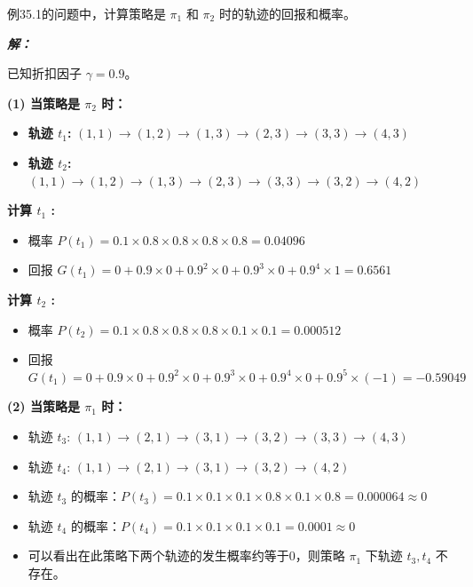 \documentclass[12pt, a4paper]{article}
\newenvironment{solution}{
	\par\vspace{0.2cm}\noindent\textbf{\color{themecolor} \textit{解：}}
}{
	\par\vspace{0.5cm} %
}
\begin{document}
	\clearpage
	\begin{problem}[习题 35.3]
		例35.1的问题中，计算策略是 $\pi_1$ 和 $\pi_2$ 时的轨迹的回报和概率。
	\end{problem}
	
	\begin{solution}
		已知折扣因子 $\gamma = 0.9$。
		
		\textbf{(1) 当策略是 $\pi_2$ 时：}
		\begin{itemize}
			\item[] \textbf{轨迹 $t_1$:} $(1,1) \to (1,2) \to (1,3) \to (2,3) \to (3,3) \to (4,3)$
			\item[] \textbf{轨迹 $t_2$:} $(1,1) \to (1,2) \to (1,3) \to (2,3) \to (3,3) \to (3,2) \to (4,2)$
		\end{itemize}
		
		\textbf{计算 $t_1$ :}
		\begin{itemize}
			\item[] 概率 $P(t_1) = 0.1 \times 0.8 \times 0.8 \times 0.8 \times 0.8  = 0.04096$ 
			\item[] 回报 $G(t_1) = 0 + 0.9 \times 0 + 0.9^2 \times 0 + 0.9^3 \times 0 + 0.9^4 \times 1 = 0.6561$
		\end{itemize}
		
		\textbf{计算 $t_2$ :}
		\begin{itemize}
			\item[] 概率 $P(t_2) = 0.1 \times 0.8 \times 0.8 \times 0.8 \times 0.1 \times 0.1 = 0.000512$ 
			\item[] 回报 $G(t_1) = 0 + 0.9 \times 0 + 0.9^2 \times 0 + 0.9^3 \times 0 + 0.9^4 \times 0 + 0.9^5 \times (-1) = -0.59049$
		\end{itemize}
		
		\textbf{(2) 当策略是 $\pi_1$ 时：}
		\begin{itemize}
			\item[] 轨迹 $t_3$: $(1,1) \to (2,1) \to (3,1) \to (3,2) \to (3,3) \to (4,3)$ 
			\item[] 轨迹 $t_4$: $(1,1) \to (2,1) \to (3,1) \to (3,2) \to (4,2)$ 
			\item[] 轨迹 $t_3$ 的概率：$P(t_3) = 0.1 \times 0.1 \times 0.1 \times 0.8 \times 0.1 \times 0.8 = 0.000064 \approx 0$ 
			\item[] 轨迹 $t_4$ 的概率：$P(t_4) = 0.1 \times 0.1 \times 0.1 \times 0.1 = 0.0001 \approx 0$ 
			\item[] 可以看出在此策略下两个轨迹的发生概率约等于0，则策略 $\pi_1$ 下轨迹 $t_3, t_4$ 不存在。 
		\end{itemize}
	\end{solution}
	
\end{document}
